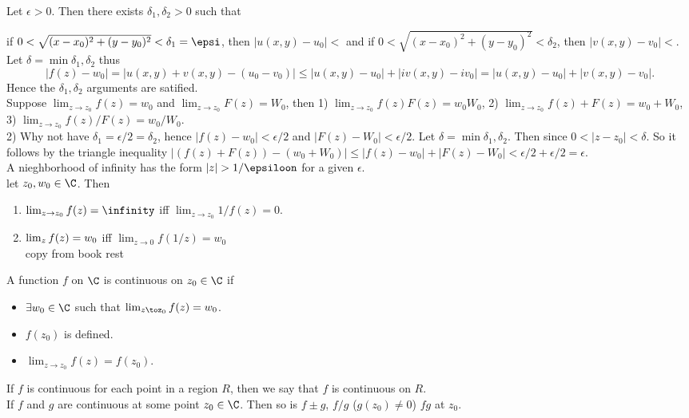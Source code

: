 \documentclass{article}
\begin{document}
Let $\epsilon > 0$. Then there exists $\delta_1,\delta_2> 0$ such that 

if $0<\sqrt{(x-x_0)^2+(y-y_0)^2}<\delta_1 = \epsi$, then $|u(x,y) - u_0| < $ and if $0<\sqrt{(x-x_0)^2+(y-y_0)^2}<\delta_2$, then $|v(x,y) - v_0| < $. Let $\delta = \min{\delta_1,\delta_2}$
thus $$|f(z) - w_0| = |u(x,y)+v(x,y) - (u_0-v_0)| \le|u(x,y) - u_0| + |iv(x,y)-iv_0| = |u(x,y) - u_0| + |v(x,y)-v_0|.$$ Hence the $\delta_1,\delta_2$  arguments are satified.\\

 Suppose $\lim_{z\to z_0} f(z) = w_0$  and $\lim_{z\to z_0} F(z) = W_0$, then 1) $\lim_{z\to z_0}f(z)F(z) = w_0W_0$, 2) $\lim_{z\to z_0}f(z) + F(z) = w_0 + W_0$, 3)  $\lim_{z\to z_0}f(z) / F(z) = w_0 / W_0$. \\

2) Why not have $\delta_1 = \epsilon/2 = \delta_2$, hence $|f(z) - w_0| < \epsilon/2$ and $|F(z) - W_0| < \epsilon/2$. Let $\delta = \min{\delta_1,\delta_2}. $ Then since $0< |z-z_0| < \delta$. So it follows by the triangle inequality $|(f(z) + F(z)) - (w_0+W_0)| \le |f(z)-w_0| + |F(z) - W_0| < \epsilon/2+\epsilon/2 = \epsilon.$\\

 A nieghborhood of infinity has the form $|z| > 1/\epsiloon$ for a given $\epsilon$.\\

 let $z_0,w_0\in \C$. Then 
\begin{enumerate}
    \item $\lim_{z\to z_0}f(z) = \infinity$ iff $\lim_{z\to z_0}1/f(z) = 0$.
    \item $\lim_{z\do \infinity}f(z) = w_0$ iff $\lim_{z\to 0}f(1/z) = w_0$\\
    copy from book rest
\end{enumerate}

 A function $f$ on $\C$ is continuous on $z_0 \in \C$ if 
\begin{itemize}
    \item $\exists w_0 \in \C$ such that $\lim_{z\toz_0}f(z) = w_0$.
    \item $f(z_0)$ is defined.
    \item $\lim_{z\to z_0}f(z) = f(z_0)$.
\end{itemize}
If $f$ is continuous for each point in a region $R$, then we say that $f$ is continuous on $R$.\\

 If $f$ and $g$ are continuous at some point $z_0 \in \C$. Then so is $f\pm g$, $f/g$ ($g(z_0) \ne 0$) $fg$ at $z_0$.\\
\end{document}
